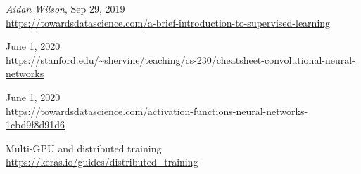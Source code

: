 \documentclass[10pt, fleqn, journal]{IEEEtran}
\theoremstyle{break}                                            %
\begin{document}
  \begin{thebibliography}{10}

      \textit{Aidan Wilson}, 
      Sep 29, 2019 \\
      \url{https://towardsdatascience.com/a-brief-introduction-to-supervised-learning}

      June 1, 2020 \\
      \url{https://stanford.edu/~shervine/teaching/cs-230/cheatsheet-convolutional-neural-networks}

      June 1, 2020 \\
      \url{https://towardsdatascience.com/activation-functions-neural-networks-1cbd9f8d91d6}


      Multi-GPU and distributed training \\
      \url{https://keras.io/guides/distributed_training}

  \end{thebibliography}
\end{document}
